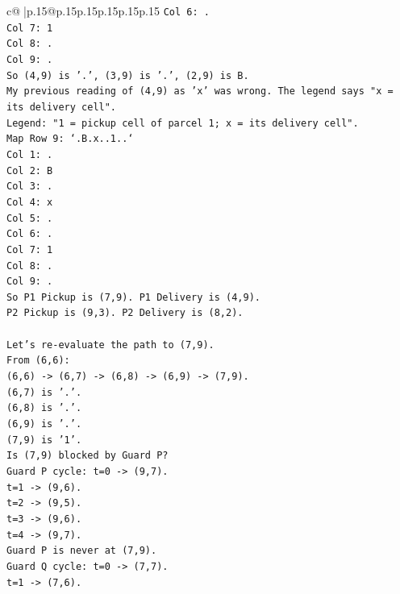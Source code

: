 \documentclass{article}
\begin{document}
{\begin{supertabular}{c@{$\;$}|p{.15\linewidth}@{}p{.15\linewidth}p{.15\linewidth}p{.15\linewidth}p{.15\linewidth}p{.15\linewidth}}
{{{\texttt{Col 6: .} \\
\texttt{Col 7: 1} \\
\texttt{Col 8: .} \\
\texttt{Col 9: .} \\
\texttt{So (4,9) is '.', (3,9) is '.', (2,9) is B.} \\
\texttt{My previous reading of (4,9) as 'x' was wrong. The legend says "x = its delivery cell".} \\
\texttt{Legend: "1 = pickup cell of parcel 1; x = its delivery cell".} \\
\texttt{Map Row 9: `.B.x..1..`} \\
\texttt{Col 1: .} \\
\texttt{Col 2: B} \\
\texttt{Col 3: .} \\
\texttt{Col 4: x} \\
\texttt{Col 5: .} \\
\texttt{Col 6: .} \\
\texttt{Col 7: 1} \\
\texttt{Col 8: .} \\
\texttt{Col 9: .} \\
\texttt{So P1 Pickup is (7,9). P1 Delivery is (4,9).} \\
\texttt{P2 Pickup is (9,3). P2 Delivery is (8,2).} \\
\\ 
\texttt{Let's re{-}evaluate the path to (7,9).} \\
\texttt{From (6,6):} \\
\texttt{(6,6) {-}> (6,7) {-}> (6,8) {-}> (6,9) {-}> (7,9).} \\
\texttt{(6,7) is '.'.} \\
\texttt{(6,8) is '.'.} \\
\texttt{(6,9) is '.'.} \\
\texttt{(7,9) is '1'.} \\
\texttt{Is (7,9) blocked by Guard P?} \\
\texttt{Guard P cycle: t=0 {-}> (9,7).} \\
\texttt{t=1 {-}> (9,6).} \\
\texttt{t=2 {-}> (9,5).} \\
\texttt{t=3 {-}> (9,6).} \\
\texttt{t=4 {-}> (9,7).} \\
\texttt{Guard P is never at (7,9).} \\
\texttt{Guard Q cycle: t=0 {-}> (7,7).} \\
\texttt{t=1 {-}> (7,6).} \\
}}}
\end{supertabular}}
\end{document}
